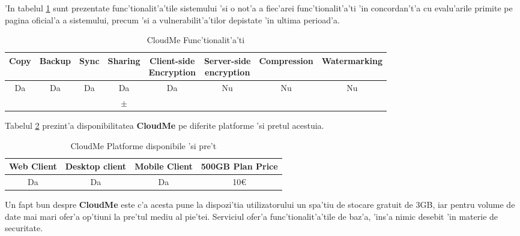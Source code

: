 \documentclass[12pt,a4paper,twoside]{report}
\newcommand{\greencheck}{\color{green}  \ding{51}}
\newcommand{\orangepm}{\color{orange} \textbf{$\pm$}}
\newcommand{\redxmark}{\color{red} \ding{55}}
\begin{document}
'In tabelul \ref{table:cloudmefeaturetable} sunt prezentate func'tionalit'a'tile sistemului 'si o not'a a fiec'arei func'tionalit'a'ti 'in concordan't'a cu evalu'arile primite pe pagina oficial'a a sistemului, precum 'si a vulnerabilit'a'tilor depistate 'in ultima perioad'a.

\begin{table}[H]
\centering
\small
\caption{CloudMe Func'tionalit'a'ti}
\begin{tabular}{|c|c|c|c|c|c|c|c|}          
\hline               
Copy & Backup & Sync & Sharing & \makecell{Client-side\\ Encryption} & \makecell{Server-side \\ encryption} & Compression & Watermarking \\ [0.5ex]   
\hline 
Da & Da & Da & Da & Da &  Nu & Nu & Nu    \\                      
\greencheck & \greencheck & \redxmark\redxmark & \orangepm & \greencheck\greencheck & \redxmark\redxmark &  \redxmark\redxmark &  \redxmark\redxmark  \\               
\hline                              
\end{tabular}
\label{table:cloudmefeaturetable}             
\end{table}
Tabelul \ref{table:cloudmesystemtable} prezint'a disponibilitatea \textbf{CloudMe} pe diferite platforme 'si pretul acestuia.
\begin{table}[H]
\centering
\caption{CloudMe Platforme disponibile 'si pre't}
\begin{tabular}{|c|c|c|c|}          
\hline                      
 Web Client & Desktop client & Mobile Client & 500GB Plan Price\\ [0.5ex]   
\hline                            
Da & Da & Da & 10\euro\\               
\hline                              
\end{tabular}
\label{table:cloudmesystemtable}             
\end{table}


Un fapt bun despre \textbf{CloudMe} este c'a acesta pune la dispozi'tia utilizatorului un spa'tiu de stocare gratuit de 3GB, iar pentru volume de date mai mari ofer'a op'tiuni la pre'tul mediu al pie'tei. Serviciul ofer'a func'tionalit'a'tile de baz'a, 'ins'a nimic desebit 'in materie de securitate. 
\end{document}
